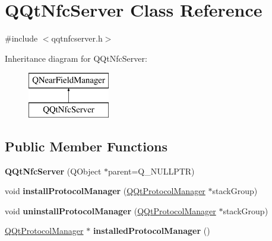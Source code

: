 \hypertarget{class_q_qt_nfc_server}{}\section{Q\+Qt\+Nfc\+Server Class Reference}
\label{class_q_qt_nfc_server}


{\ttfamily \#include $<$qqtnfcserver.\+h$>$}

Inheritance diagram for Q\+Qt\+Nfc\+Server\+:\begin{figure}[H]
\begin{center}
\leavevmode
\includegraphics[height=2.000000cm]{class_q_qt_nfc_server}
\end{center}
\end{figure}
\subsection*{Public Member Functions}
\begin{DoxyCompactItemize}
\item 
\mbox{\label{class_q_qt_nfc_server_a00ab2f319fb667f1724aece69dd0e683}} 
{\bfseries Q\+Qt\+Nfc\+Server} (Q\+Object $\ast$parent=Q\+\_\+\+N\+U\+L\+L\+P\+TR)
\item 
\mbox{\label{class_q_qt_nfc_server_a49504a3fea2e9e10466c5fcc1f7fd6f3}} 
void {\bfseries install\+Protocol\+Manager} (\mbox{\hyperlink{class_q_qt_protocol_manager}{Q\+Qt\+Protocol\+Manager}} $\ast$stack\+Group)
\item 
\mbox{\label{class_q_qt_nfc_server_aa5546cef8cdcd4fd180ddf705ba7afd0}} 
void {\bfseries uninstall\+Protocol\+Manager} (\mbox{\hyperlink{class_q_qt_protocol_manager}{Q\+Qt\+Protocol\+Manager}} $\ast$stack\+Group)
\item 
\mbox{\label{class_q_qt_nfc_server_ab3cd2551f5a7b0a92c5c6e30002e3d58}} 
\mbox{\hyperlink{class_q_qt_protocol_manager}{Q\+Qt\+Protocol\+Manager}} $\ast$ {\bfseries installed\+Protocol\+Manager} ()
\end{DoxyCompactItemize}
